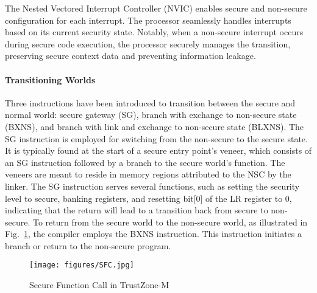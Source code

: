 The Nested Vectored Interrupt Controller (NVIC) enables secure and
non-secure configuration for each interrupt. The processor seamlessly
handles interrupts based on its current security state. Notably, when a
non-secure interrupt occurs during secure code execution, the processor
securely manages the transition, preserving secure context data and
preventing information leakage.

\paragraph{\textbf{Transitioning Worlds}}
%
Three instructions have been introduced to transition between the secure
and normal world: secure gateway (\ac{SG}), branch with exchange to
non-secure state (\ac{BXNS}), and branch with link and exchange to
non-secure state (\ac{BLXNS}). The \ac{SG} instruction is employed for
switching from the non-secure to the secure state. It is typically found at
the start of a secure entry point's veneer, which consists of an \ac{SG}
instruction followed by a branch to the secure world's function. The
veneers are meant to reside in memory regions attributed to the \ac{NSC} by
the linker. The \ac{SG} instruction serves several functions, such as
setting the security level to secure, banking registers, and resetting
bit[0] of the LR register to 0, indicating that the return will lead to a
transition back from secure to non-secure.  To return from the secure world
to the non-secure world, as illustrated in Fig.~\ref{fig:Ttansition}, the
compiler employs the \ac{BXNS} instruction.  This instruction initiates a
branch or return to the non-secure program.

\begin{figure}
  \centering
  \texttt{[image: figures/SFC.jpg]}
  \caption{Secure Function Call in TrustZone-M}
  \label{fig:Ttansition}
\end{figure}


